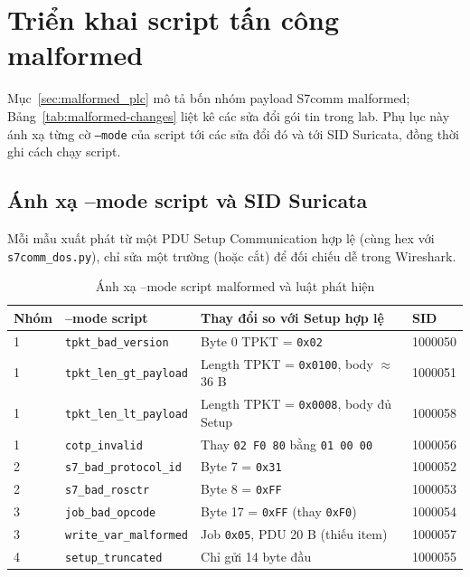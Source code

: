 \documentclass[../main.tex]{subfiles}
\begin{document}
\section{Triển khai script tấn công malformed}
\label{app:malformed-script-deploy}

Mục~\ref{sec:malformed_plc} mô tả bốn nhóm payload S7comm malformed; Bảng~\ref{tab:malformed-changes} liệt kê các sửa đổi gói tin trong lab. Phụ lục này ánh xạ từng cờ \texttt{--mode} của script tới các sửa đổi đó và tới SID Suricata, đồng thời ghi cách chạy script.

\subsection{Ánh xạ --mode script và SID Suricata}

Mỗi mẫu xuất phát từ một PDU Setup Communication hợp lệ (cùng hex với \texttt{s7comm\_dos.py}), chỉ sửa một trường (hoặc cắt) để đối chiếu dễ trong Wireshark.

\begin{table}[H]
    \centering
    \footnotesize
    \begin{tabular}{|l|l|l|l|}
        \hline
        \textbf{Nhóm} & \textbf{--mode script} & \textbf{Thay đổi so với Setup hợp lệ} & \textbf{SID} \\
        \hline
        1 & \texttt{tpkt\_bad\_version} & Byte 0 TPKT = \texttt{0x02} & 1000050 \\
        \hline
        1 & \texttt{tpkt\_len\_gt\_payload} & Length TPKT = \texttt{0x0100}, body $\approx$ 36 B & 1000051 \\
        \hline
        1 & \texttt{tpkt\_len\_lt\_payload} & Length TPKT = \texttt{0x0008}, body đủ Setup & 1000058 \\
        \hline
        1 & \texttt{cotp\_invalid} & Thay \texttt{02 F0 80} bằng \texttt{01 00 00} & 1000056 \\
        \hline
        2 & \texttt{s7\_bad\_protocol\_id} & Byte 7 = \texttt{0x31} & 1000052 \\
        \hline
        2 & \texttt{s7\_bad\_rosctr} & Byte 8 = \texttt{0xFF} & 1000053 \\
        \hline
        3 & \texttt{job\_bad\_opcode} & Byte 17 = \texttt{0xFF} (thay \texttt{0xF0}) & 1000054 \\
        \hline
        3 & \texttt{write\_var\_malformed} & Job \texttt{0x05}, PDU 20 B (thiếu item) & 1000057 \\
        \hline
        4 & \texttt{setup\_truncated} & Chỉ gửi 14 byte đầu & 1000055 \\
        \hline
    \end{tabular}
    \caption{Ánh xạ --mode script malformed và luật phát hiện}
    \label{tab:malformed-phases}
\end{table}
\end{document}
